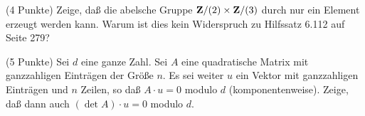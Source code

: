 \documentclass{algsheet}
\begin{document}
\begin{exercise}(4 Punkte)\newline
    Zeige, daß die abelsche Gruppe \(\mathbf Z/(2) \times \mathbf Z/(3)\) durch nur ein Element
    erzeugt werden kann. Warum ist dies kein Widerspruch zu Hilfssatz 6.112 auf Seite 279?
\end{exercise}


\begin{exercise}(5 Punkte)\newline
    Sei \(d\) eine ganze Zahl.
    Sei \(A\) eine quadratische Matrix mit ganzzahligen Einträgen der Größe \(n\). Es sei
    weiter \(u\) ein Vektor mit ganzzahligen Einträgen und \(n\) Zeilen, so daß
    \(A \cdot u = 0\) modulo \(d\) (komponentenweise). Zeige, daß dann auch
    \((\det A) \cdot u = 0\) modulo \(d\).
\end{exercise}
\end{document}

